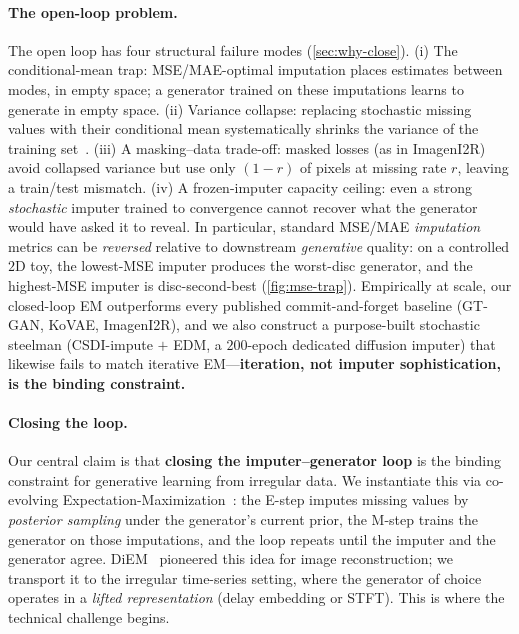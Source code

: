 \documentclass{article}
\theoremstyle{plain}
\theoremstyle{definition}
\theoremstyle{remark}
\begin{document}
\paragraph{The open-loop problem.}
The open loop has four structural failure modes (\cref{sec:why-close}). (i) The conditional-mean trap: MSE/MAE-optimal imputation places estimates between modes, in empty space; a generator trained on these imputations learns to generate in empty space. (ii) Variance collapse: replacing stochastic missing values with their conditional mean systematically shrinks the variance of the training set~\citep{rubin1987multiple}. (iii) A masking--data trade-off: masked losses (as in ImagenI2R) avoid collapsed variance but use only $(1-r)$ of pixels at missing rate $r$, leaving a train/test mismatch. (iv) A frozen-imputer capacity ceiling: even a strong \emph{stochastic} imputer trained to convergence cannot recover what the generator would have asked it to reveal. In particular, standard MSE/MAE \emph{imputation} metrics can be \emph{reversed} relative to downstream \emph{generative} quality: on a controlled $2$D toy, the lowest-MSE imputer produces the worst-disc generator, and the highest-MSE imputer is disc-second-best (\cref{fig:mse-trap}). Empirically at scale, our closed-loop EM outperforms every published commit-and-forget baseline (GT-GAN, KoVAE, ImagenI2R), and we also construct a purpose-built stochastic steelman (CSDI-impute $+$ EDM, a $200$-epoch dedicated diffusion imputer) that likewise fails to match iterative EM---\textbf{iteration, not imputer sophistication, is the binding constraint.}

\paragraph{Closing the loop.}
Our central claim is that \textbf{closing the imputer--generator loop} is the binding constraint for generative learning from irregular data. We instantiate this via co-evolving Expectation-Maximization~\citep{dempster1977em}: the E-step imputes missing values by \emph{posterior sampling} under the generator's current prior, the M-step trains the generator on those imputations, and the loop repeats until the imputer and the generator agree. DiEM~\citep{rozet2024diem} pioneered this idea for image reconstruction; we transport it to the irregular time-series setting, where the generator of choice~\citep{naiman2024imagentime} operates in a \emph{lifted representation} (delay embedding or STFT). This is where the technical challenge begins.
\end{document}
